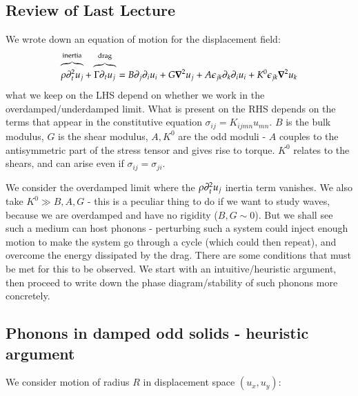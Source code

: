 \section{}

\subsection{Review of Last Lecture}
We wrote down an equation of motion for the displacement field:
\begin{equation}
    \overbrace{\rho \p_t^2 u_j}^{\text{inertia}} + \overbrace{\Gamma \p_t u_j}^{\text{drag}} = B\p_j \p_i u_i + G \nabla^2 u_j + A\e_{jk}\p_k \p_i u_i + K^0\e_{jk}\nabla^2 u_k
\end{equation}
what we keep on the LHS depend on whether we work in the overdamped/underdamped limit. What is present on the RHS depends on the terms that appear in the constitutive equation $\sigma_{ij} = K_{ijmn}u_{mn}$. $B$ is the bulk modulus, $G$ is the shear modulus, $A, K^0$ are the odd moduli - $A$ couples to the antisymmetric part of the stress tensor and gives rise to torque. $K^0$ relates to the shears, and can arise even if $\sigma_{ij} = \sigma_{ji}$.

We consider the overdamped limit where the $\rho\partial_t^2 u_j$ inertia term vanishes. We also take $K^0 \gg B, A, G$ - this is a peculiar thing to do if we want to study waves, because we are overdamped and have no rigidity ($B, G \sim 0$). But we shall see such a medium can host phonons - perturbing such a system could inject enough motion to make the system go through a cycle (which could then repeat), and overcome the energy dissipated by the drag. There are some conditions that must be met for this to be observed. We start with an intuitive/heuristic argument, then proceed to write down the phase diagram/stability of such phonons more concretely.


\subsection{Phonons in damped odd solids - heuristic argument}

We consider motion of radius $R$ in displacement space $(u_x, u_y)$:

